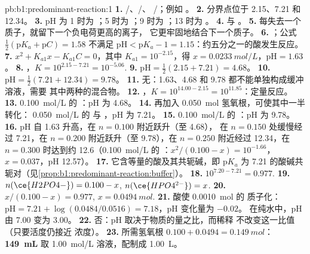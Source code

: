 \begin{solution}{pb:b1:predominant-reaction:1}
\textbf{1.} /、/、
/；例如 。
\textbf{2.} 分界点位于 2.15、7.21 和 12.34。
\textbf{3.} pH 为 1 时为 ；5 时为 ；9 时为 ；13 时为
。
\textbf{4.}  与 。
\textbf{5.} 每失去一个质子，就留下一个负电荷更高的离子，
它更牢固地结合下一个质子。
\textbf{6.} ；公式
$\frac12(\mathrm{p}K_a + \mathrm{p}C) = 1.58$ 不满足 $\mathrm{pH} <
\mathrm{p}K_a - 1 = 1.15$：约五分之一的酸发生反应。
\textbf{7.} $x^2 + K_{a1}x - K_{a1}C = 0$，其中 $K_{a1} = 10^{-2.15}$，得 $x =
\qty{0.0233}{mol/L}$，$\mathrm{pH} = 1.63$。
\textbf{8.} ，$K = 10^{2.15 - 7.21} =
10^{-5.06}$.
\textbf{9.} $\mathrm{pH} = \frac12(2.15 + 7.21) = 4.68$。
\textbf{10.} $\mathrm{pH} = \frac12(7.21 + 12.34) = 9.78$。
\textbf{11.} 无：1.63、4.68 和 9.78 都不能单独构成缓冲溶液，需要
其中两种的混合物。
\textbf{12.} ，$K = 10^{14.00 - 2.15} =
10^{11.85}$：定量反应。
\textbf{13.} \qty{0.100}{mol/L} 的 ：pH 为 4.68。
\textbf{14.} 再加入 \qty{0.050}{mol} 氢氧根，可使其中一半转化：
\qty{0.050}{mol/L} 的  与 ，pH 为 7.21。
\textbf{15.} \qty{0.100}{mol/L} 的 ：pH 为 9.78。
\textbf{16.} pH 自 1.63 升高，在 $n = 0.100$ 附近跃升（至 4.68），
在 $n = 0.150$ 处缓慢经过 7.21，在 $n = 0.200$ 附近跃升（至
9.78），在 $n = 0.250$ 附近经过 12.34，在 $n = 0.300$ 时达到约 12.6（\qty{0.100}{mol/L} 的 ：$x^2/(0.100 - x) = 10^{-1.66}$，$x = 0.037$，pH 12.57）。
\textbf{17.} 它含等量的酸及其共轭碱，即
$\mathrm{p}K_a$ 为 7.21 的酸碱共轭对（见\cref{prop:b1:predominant-reaction:buffer}）。
\textbf{18.} $10^{7.20 - 7.21} = 0.977$.
\textbf{19.} $n(\ce{H2PO4-}) = 0.100 - x$, $n(\ce{HPO4^{2-}}) = x$.
\textbf{20.} $x/(0.100 - x) = 0.977$, $x = \qty{0.0494}{mol}$.
\textbf{21.} 酸使 \qty{0.0010}{mol} 的  质子化：
$\mathrm{pH} = 7.21 + \log(0.0484/0.0516) = 7.18$，pH 变化量为 $-0.02$。
在纯水中，pH 由 7.00 变为 3.00。
\textbf{22.} 否：pH 取决于物质的量之比，而稀释
不改变这一比值（只要活度仍接近
浓度）。
\textbf{23.} 所需氢氧根 $0.100 + 0.0494 = \qty{0.149}{mol}$：\textbf{\qty{149}{mL}}
取 \qty{1.00}{mol/L} 溶液，配制成 \qty{1.00}{L}。
\end{solution}

